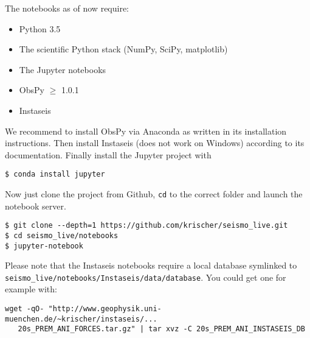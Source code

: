 \documentclass[11pt,titlepage,fleqn]{article}
\begin{document}
The notebooks as of now require:
%
\begin{itemize}
\item Python 3.5
\item The scientific Python stack (NumPy, SciPy, matplotlib)
\item The Jupyter notebooks
\item ObsPy $\ge$ 1.0.1
\item Instaseis
\end{itemize}
%
We recommend to install ObsPy via Anaconda as written in its installation instructions. Then install Instaseis (does not work on Windows) according to its documentation. Finally install the Jupyter project with
%
\begin{verbatim}
$ conda install jupyter
\end{verbatim}
%
Now just clone the project from Github, \verb+cd+ to the correct folder and launch the notebook server.
%
\begin{verbatim}
$ git clone --depth=1 https://github.com/krischer/seismo_live.git
$ cd seismo_live/notebooks
$ jupyter-notebook
\end{verbatim}
%
Please note that the Instaseis notebooks require a local database symlinked to \verb+seismo_live/notebooks/Instaseis/data/database+. You could get one for example with:
%
\begin{verbatim}
wget -qO- "http://www.geophysik.uni-muenchen.de/~krischer/instaseis/...
   20s_PREM_ANI_FORCES.tar.gz" | tar xvz -C 20s_PREM_ANI_INSTASEIS_DB
\end{verbatim}


\iffalse
rec = instaseis.Receiver(latitude=64.873599, longitude=-147.861600,
                         network="IU", station="COLA")

src = instaseis.Source.from_strike_dip_rake(
    latitude=-8.65, longitude=115.80, depth_in_m=20000.0,
    M0=4.87e+18, strike=79., dip=21., rake=77.)

EMAILED TO MARTIN AND LION -->

suggestions for the instaseis opener
+ can we get 4 hours of seismograms instead of 1 hour? (R1 and R2)
+ can we get depths to 700 km? (150 km limit)
+ enter in Mij so that one can check with the GCMT Mij
+ typo with the double km km:
  Depth            : 2.0e+01 km km
+ remind the user that GCMT is dyne-cm not N-m
+ remind user that the origin time (1970) does not matter in this example
+ rotate to radial and transverse -- show all 5 seismograms

typos in the Applied Seismology module
we: Here wer have assumed that the instrument response
it: Here we see that is consists of multiple stages
hour: Plot the first our - slice() will leave the original
\fi



\end{document}
